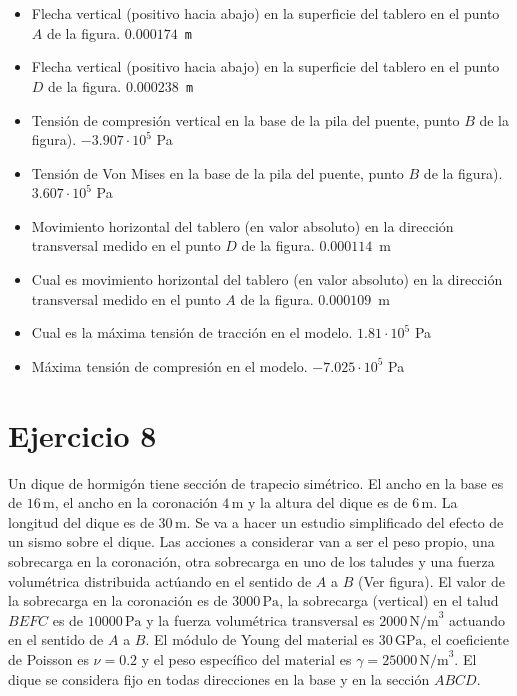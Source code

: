 \documentclass[a4paper,12pt]{article}
\begin{document}
\begin{itemize}
	\item Flecha vertical (positivo hacia abajo) en la superficie del tablero en el punto $A$
de la figura.
    {\tt $0.000174$ m}
\item Flecha vertical (positivo hacia abajo) en la superficie del tablero en el punto $D$
de la figura.
    {\tt $0.000238$ m}
\item Tensión de compresión vertical en la base de la pila 
del puente, punto $B$ de la figura).
    {$-3.907\cdot 10^5$ Pa}
\item Tensión de Von Mises en la base de la pila 
del puente, punto $B$ de la figura).
    {$3.607\cdot 10^5$ Pa}
\item Movimiento horizontal del tablero (en valor absoluto) en la dirección transversal medido en el punto $D$ de la figura.
    {$0.000114\,$ m}
\item Cual es movimiento horizontal del tablero (en valor absoluto) en la dirección transversal medido en el punto $A$ de 
la figura.
    {$0.000109\,$ m}
\item Cual es la máxima tensión de tracción en el modelo.
    {$1.81\cdot 10^5$ Pa}
\item Máxima tensión de compresión en el modelo.
	{$-7.025\cdot 10^5$ Pa}
\end{itemize}


\clearpage
\section{Ejercicio 8}
\label{sec:probprop5}

Un dique de hormigón tiene sección de trapecio simétrico. El ancho en 
la base es de  $16\,\text{m}$, el ancho en la coronación $4\,\text{m}$ y 
la altura del dique es de $6\,\text{m}$. La longitud del dique es de $30\,\text{m}$.
Se va a hacer un estudio simplificado del efecto de un sismo sobre el dique.
Las acciones a considerar van a ser el peso propio, una sobrecarga en la coronación, otra sobrecarga en uno de los taludes  y una fuerza volumétrica distribuida actúando en el
sentido de $A$ a $B$ (Ver figura).
El valor de la sobrecarga en la coronación es de $3000\,\text{Pa}$, la sobrecarga (vertical) en
el talud $BEFC$ es de  $10000\,\text{Pa}$ y  la fuerza volumétrica transversal es
  $2000\,\text{N/m}^{3}$ actuando en el sentido de $A$ a $B$.
El módulo de Young del material es $30\,\text{GPa}$, el coeficiente de Poisson es $\nu=0.2$ y el peso específico
del material es $\gamma=25000\,\text{N/m}^{3}$.
El dique se considera fijo en todas direcciones en la base y en la sección $ABCD$. 
\end{document}
